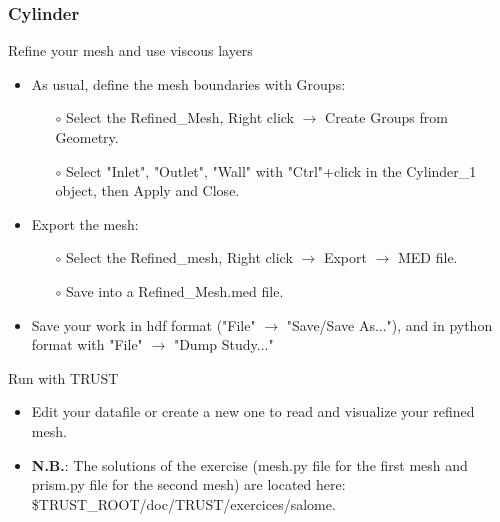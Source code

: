 \documentclass[10pt, hyperref={unicode=true,pdfusetitle, bookmarks=true,bookmarksnumbered=false,bookmarksopen=false, breaklinks=false,pdfborder={0 0 1},backref=true,colorlinks=true,linkcolor=darkblue,pageanchor}]{beamer}
\begin{document}
\begin{frame}
\frametitle{Cylinder}

\begin{block}{Refine your mesh and use viscous layers}
\begin{itemize}
\item As usual, define the mesh boundaries with Groups:
    \begin{itemize}
    \item [$\circ$] Select the Refined\_Mesh, Right click $\rightarrow$ Create Groups from Geometry.
    \item [$\circ$] Select "Inlet", "Outlet", "Wall" with "Ctrl"+click in the Cylinder\_1 object, then Apply and Close.
    \end{itemize}

\item Export the mesh:
    \begin{itemize}
    \item [$\circ$] Select the Refined\_mesh, Right click $\rightarrow$ Export $\rightarrow$ MED file.
    \item [$\circ$] Save into a Refined\_Mesh.med file.
    \end{itemize}

\item Save your work in hdf format ("File" $\rightarrow$ "Save/Save As..."), and in python format with "File" $\rightarrow$ "Dump Study..."
\end{itemize}
\end{block}


\begin{block}{Run with TRUST}
\begin{itemize}
\item Edit your datafile or create a new one to read and visualize your refined mesh.

\item \textbf{N.B.}: The solutions of the exercise (mesh.py file for the first mesh and prism.py file for the second mesh) are located here: \$TRUST\_ROOT/doc/TRUST/exercices/salome.
\end{itemize}

\end{block}
\end{frame}
\end{document}
